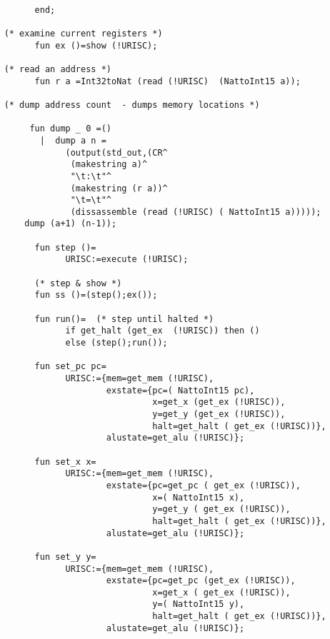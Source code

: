 \begin{verbatim}
                 
          end; 
           
	(* examine current registers *)
          fun ex ()=show (!URISC); 
           
	(* read an address *)
          fun r a =Int32toNat (read (!URISC)  (NattoInt15 a)); 
          
	(* dump address count  - dumps memory locations *)
 
         fun dump _ 0 =() 
           |  dump a n = 
                (output(std_out,(CR^ 
                 (makestring a)^ 
                 "\t:\t"^
                 (makestring (r a))^ 
                 "\t=\t"^ 
                 (dissassemble (read (!URISC) ( NattoInt15 a)))));
		dump (a+1) (n-1)); 
           
          fun step ()= 
                URISC:=execute (!URISC); 
           
          (* step & show *) 
          fun ss ()=(step();ex()); 
           
          fun run()=  (* step until halted *) 
                if get_halt (get_ex  (!URISC)) then () 
                else (step();run()); 
           
          fun set_pc pc= 
                URISC:={mem=get_mem (!URISC), 
                        exstate={pc=( NattoInt15 pc), 
                                 x=get_x (get_ex (!URISC)), 
                                 y=get_y (get_ex (!URISC)), 
                                 halt=get_halt ( get_ex (!URISC))}, 
                        alustate=get_alu (!URISC)};

          fun set_x x= 
                URISC:={mem=get_mem (!URISC), 
                        exstate={pc=get_pc ( get_ex (!URISC)), 
                                 x=( NattoInt15 x),
                                 y=get_y ( get_ex (!URISC)), 
                                 halt=get_halt ( get_ex (!URISC))}, 
                        alustate=get_alu (!URISC)}; 

          fun set_y y= 
                URISC:={mem=get_mem (!URISC), 
                        exstate={pc=get_pc (get_ex (!URISC)), 
                                 x=get_x ( get_ex (!URISC)), 
                                 y=( NattoInt15 y),
                                 halt=get_halt ( get_ex (!URISC))}, 
                        alustate=get_alu (!URISC)};


\end{verbatim}
